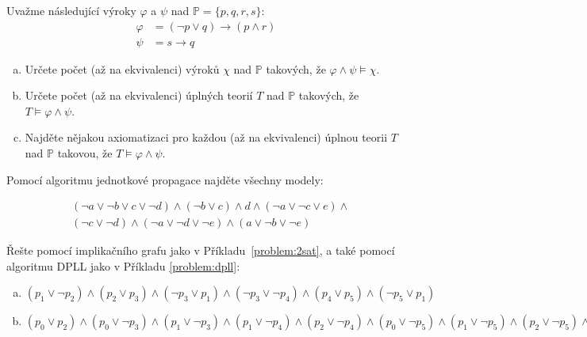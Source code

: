 \documentclass[a4paper,11pt]{amsart}
\begin{document}
\begin{problem}

    Uvažme následující výroky $\varphi$ a $\psi$ nad $\mathbb P=\{p, q, r, s\}$:
    \begin{align*}
        \varphi &= (\neg p \vee  q)\to(p\wedge r)\\
        \psi &= s\to q
    \end{align*}
    \begin{enumerate}[(a)]
        \item Určete počet (až na ekvivalenci) výroků $\chi$ nad $\mathbb P$ takových, že $\varphi\wedge\psi\models\chi$.
        \item Určete počet (až na ekvivalenci) úplných teorií $T$ nad $\mathbb P$ takových, že $T\models\varphi\wedge\psi$.
        \item Najděte nějakou axiomatizaci pro každou (až na ekvivalenci) úplnou teorii $T$ nad $\mathbb P$ takovou, že $T\models\varphi\wedge\psi$.
    \end{enumerate}

\end{problem}


\begin{problem} 
    
    Pomocí algoritmu jednotkové propagace najděte všechny modely:

    \begin{align*}
    &(\neg a \vee \neg b \vee c \vee \neg d)\wedge(\neg b \vee c)\wedge d \wedge (\neg a \vee \neg c \vee e)\wedge \\
    &(\neg c \vee \neg d)\wedge(\neg a \vee \neg d \vee \neg e)\wedge(a\vee \neg b \vee\neg e)
    \end{align*}

\end{problem}

    
\begin{problem} 
    
    Řešte pomocí implikačního grafu jako v Příkladu~\ref{problem:2sat}, a také pomocí algoritmu DPLL jako v Příkladu \ref{problem:dpll}:
    \begin{enumerate}[(a)]
        \item $(p_1\vee \neg p_2)\wedge (p_2\vee p_3)\wedge (\neg p_3\vee p_1)\wedge (\neg p_3\vee \neg p_4)\wedge (p_4\vee p_5)\wedge (\neg p_5\vee p_1)$
        \item $(p_0 \vee  p_2) \wedge  (p_0 \vee  \neg p_3) \wedge  (p_1 \vee  \neg p_3) 
        \wedge  (p_1 \vee  \neg p_4) \wedge  (p_2 \vee  \neg p_4) 
        \wedge  (p_0 \vee  \neg p_5)
        \wedge 
        (p_1 \vee  \neg p_5) \wedge  (p_2 \vee  \neg p_5) \wedge  (\neg p_1 \vee  \neg p_6) \wedge  (p_4 \vee  p_6) \wedge  (p_5 \vee  p_6) \wedge  p_1\wedge \neg p_7$
    \end{enumerate}

\end{problem}
\end{document}
